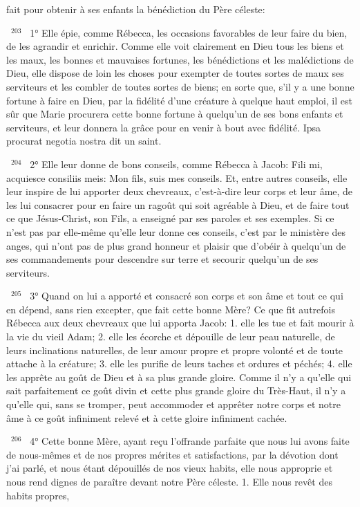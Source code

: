 \documentclass[paper=a5,pagesize=pdftex,fontsize=15pt,headinclude=on,twoside=off]{scrbook}
\newcommand{\negphantom}[1]{\settowidth{\dimen0}{#1}\hspace*{-\dimen0}}
\newcommand{\versenb}[1]{\par \vspace{10pt}~\negphantom{~${}^{#1}$~}${}^{#1}$~}
\begin{document}
fait pour obtenir à ses enfants la bénédiction du Père céleste:
\versenb{203} 1° Elle épie, comme Rébecca, les occasions favorables de leur faire du bien, de les agrandir et enrichir.
Comme elle voit clairement en Dieu tous les biens et les maux, les bonnes et mauvaises fortunes, les bénédictions
et les malédictions de Dieu, elle dispose de loin les choses pour exempter de toutes sortes de maux ses serviteurs
et les combler de toutes sortes de biens; en sorte que, s'il y a une bonne fortune à faire en Dieu, par la fidélité
d'une créature à quelque haut emploi, il est sûr que Marie procurera cette bonne fortune à quelqu'un de ses bons
enfants et serviteurs, et leur donnera la grâce pour en venir à bout avec fidélité. Ipsa procurat negotia nostra dit un
saint.
\versenb{204} 2° Elle leur donne de bons conseils, comme Rébecca à Jacob: Fili mi, acquiesce consiliis meis: Mon fils, suis
mes conseils. Et, entre autres conseils, elle leur inspire de lui apporter deux chevreaux, c'est-à-dire leur corps et
leur âme, de les lui consacrer pour en faire un ragoût qui soit agréable à Dieu, et de faire tout ce que Jésus-Christ,
son Fils, a enseigné par ses paroles et ses exemples. Si ce n'est pas par elle-même qu'elle leur donne ces
conseils, c'est par le ministère des anges, qui n'ont pas de plus grand honneur et plaisir que d'obéir à quelqu'un de
ses commandements pour descendre sur terre et secourir quelqu'un de ses serviteurs.
\versenb{205} 3° Quand on lui a apporté et consacré son corps et son âme et tout ce qui en dépend, sans rien excepter,
que fait cette bonne Mère? Ce que fit autrefois Rébecca aux deux chevreaux que lui apporta Jacob: 1. elle les tue
et fait mourir à la vie du vieil Adam; 2. elle les écorche et dépouille de leur peau naturelle, de leurs inclinations
naturelles, de leur amour propre et propre volonté et de toute attache à la créature; 3. elle les purifie de leurs
taches et ordures et péchés; 4. elle les apprête au goût de Dieu et à sa plus grande gloire. Comme il n'y a qu'elle
qui sait parfaitement ce goût divin et cette plus grande gloire du Très-Haut, il n'y a qu'elle qui, sans se tromper,
peut accommoder et apprêter notre corps et notre âme à ce goût infiniment relevé et à cette gloire infiniment
cachée.
\versenb{206} 4° Cette bonne Mère, ayant reçu l'offrande parfaite que nous lui avons faite de nous-mêmes et de nos
propres mérites et satisfactions, par la dévotion dont j'ai parlé, et nous étant dépouillés de nos vieux habits, elle
nous approprie et nous rend dignes de paraître devant notre Père céleste. 1. Elle nous revêt des habits propres,
\end{document}
